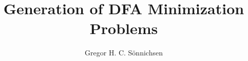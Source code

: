 \documentclass[a4paper, oneside, 12pt]{report}
\title{Generation of DFA Minimization Problems}
\author{Gregor H. C. Sönnichsen}
\theoremstyle{definition}
\theoremstyle{remark}
\begin{document}
	
	\maketitle
	
	
	
	\tableofcontents
	
	
	
	
	
	
	
	\appendix
	
	\nocite{*}
	
	
\end{document}
